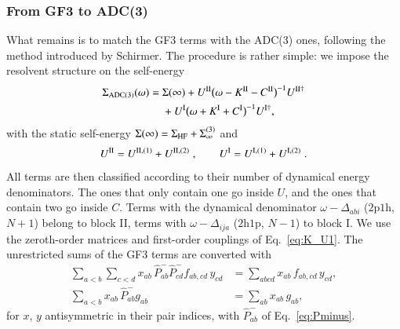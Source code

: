 \documentclass[aip,jcp,reprint,noshowkeys,superscriptaddress]{revtex4-1}
\newcommand{\hhp}{\text{2h1p}}
\newcommand{\pph}{\text{2p1h}}
\begin{document}
\subsubsection{From GF3 to ADC(3)}
What remains is to match the GF3 terms with the ADC(3) ones, 
following the method introduced by Schirmer.\cite{Schirmer1983}
The procedure is rather simple: we impose the resolvent 
structure on the self-energy
\begin{align}
	\label{eq:ADC3}
\Sigma_{\rm ADC(3)}(\omega)
={}&
\Sigma(\infty)
+
U^{\rm II}\big(\omega-K^{\rm II}-C^{\rm II}\big)^{-1}U^{{\rm II}\dagger}
\nonumber\\
&+
U^{\rm I}\big(\omega+K^{\rm I}+C^{\rm I}\big)^{-1}U^{{\rm I}\dagger},
\end{align}
with the static self-energy
$\Sigma(\infty)=\Sigma_{\rm HF}+\Sigma^{(3)}_{\infty}$ and
\begin{equation}
U^{\rm II}
=  U^{{\rm II},(1)}+U^{{\rm II},(2)} \;,
\qquad
U^{\rm I}
=  U^{{\rm I},(1)}+U^{{\rm I},(2)} \;.
\end{equation}
All terms are then classified according to their number of 
dynamical energy denominators. The ones that 
only contain one go inside $U$, and the ones that contain 
two go inside $C$.
Terms with the dynamical denominator $\omega-\Delta_{abi}$
($\pph$, $N+1$) belong to block II, terms with $\omega-\Delta_{ija}$
($\hhp$, $N-1$) to block I.
We use the zeroth-order matrices and first-order couplings of
Eq.~\eqref{eq:K_U1}. The unrestricted sums
of the GF3 terms are converted with
\begin{align}
\sum_{a<b}\sum_{c<d}x_{ab}\,
\hat P^-_{ab}\hat P^-_{cd}f_{ab,cd}\,y_{cd}
&=
\sum_{abcd}x_{ab}\,f_{ab,cd}\,y_{cd},
\nonumber\\
\sum_{a<b}x_{ab}\,\hat P^-_{ab}g_{ab}
&=
\sum_{ab}x_{ab}\,g_{ab},
\label{eq:pair_identities}
\end{align}
for $x$, $y$ antisymmetric in their pair indices, with $\hat P^-_{ab}$ of Eq.~\eqref{eq:Pminus}.
\end{document}
